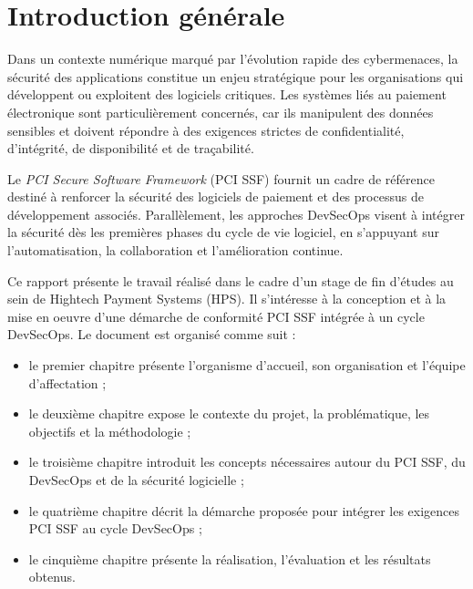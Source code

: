 \chapter*{Introduction générale}

Dans un contexte numérique marqué par l'évolution rapide des cybermenaces, la sécurité des applications constitue un enjeu stratégique pour les organisations qui développent ou exploitent des logiciels critiques. Les systèmes liés au paiement électronique sont particulièrement concernés, car ils manipulent des données sensibles et doivent répondre à des exigences strictes de confidentialité, d'intégrité, de disponibilité et de traçabilité.

Le \textit{PCI Secure Software Framework} (PCI SSF) fournit un cadre de référence destiné à renforcer la sécurité des logiciels de paiement et des processus de développement associés. Parallèlement, les approches DevSecOps visent à intégrer la sécurité dès les premières phases du cycle de vie logiciel, en s'appuyant sur l'automatisation, la collaboration et l'amélioration continue.

Ce rapport présente le travail réalisé dans le cadre d'un stage de fin d'études au sein de Hightech Payment Systems (HPS). Il s'intéresse à la conception et à la mise en oeuvre d'une démarche de conformité PCI SSF intégrée à un cycle DevSecOps. Le document est organisé comme suit :

\begin{itemize}
    \item le premier chapitre présente l'organisme d'accueil, son organisation et l'équipe d'affectation ;
    \item le deuxième chapitre expose le contexte du projet, la problématique, les objectifs et la méthodologie ;
    \item le troisième chapitre introduit les concepts nécessaires autour du PCI SSF, du DevSecOps et de la sécurité logicielle ;
    \item le quatrième chapitre décrit la démarche proposée pour intégrer les exigences PCI SSF au cycle DevSecOps ;
    \item le cinquième chapitre présente la réalisation, l'évaluation et les résultats obtenus.
\end{itemize}

\clearpage
